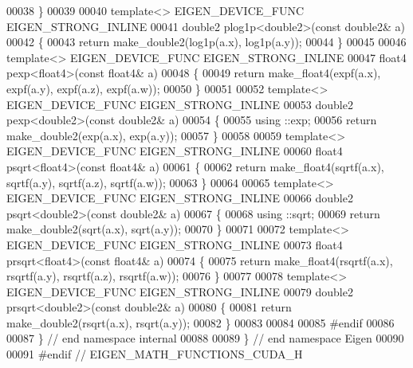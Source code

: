 \begin{DoxyCode}
00038 \}
00039 
00040 \textcolor{keyword}{template}<>  EIGEN\_DEVICE\_FUNC EIGEN\_STRONG\_INLINE
00041 double2 plog1p<double2>(\textcolor{keyword}{const} double2& a)
00042 \{
00043   \textcolor{keywordflow}{return} make\_double2(log1p(a.x), log1p(a.y));
00044 \}
00045 
00046 \textcolor{keyword}{template}<> EIGEN\_DEVICE\_FUNC EIGEN\_STRONG\_INLINE
00047 float4 pexp<float4>(\textcolor{keyword}{const} float4& a)
00048 \{
00049   \textcolor{keywordflow}{return} make\_float4(expf(a.x), expf(a.y), expf(a.z), expf(a.w));
00050 \}
00051 
00052 \textcolor{keyword}{template}<> EIGEN\_DEVICE\_FUNC EIGEN\_STRONG\_INLINE
00053 double2 pexp<double2>(\textcolor{keyword}{const} double2& a)
00054 \{
00055   using ::exp;
00056   \textcolor{keywordflow}{return} make\_double2(exp(a.x), exp(a.y));
00057 \}
00058 
00059 \textcolor{keyword}{template}<> EIGEN\_DEVICE\_FUNC EIGEN\_STRONG\_INLINE
00060 float4 psqrt<float4>(\textcolor{keyword}{const} float4& a)
00061 \{
00062   \textcolor{keywordflow}{return} make\_float4(sqrtf(a.x), sqrtf(a.y), sqrtf(a.z), sqrtf(a.w));
00063 \}
00064 
00065 \textcolor{keyword}{template}<> EIGEN\_DEVICE\_FUNC EIGEN\_STRONG\_INLINE
00066 double2 psqrt<double2>(\textcolor{keyword}{const} double2& a)
00067 \{
00068   using ::sqrt;
00069   \textcolor{keywordflow}{return} make\_double2(sqrt(a.x), sqrt(a.y));
00070 \}
00071 
00072 \textcolor{keyword}{template}<> EIGEN\_DEVICE\_FUNC EIGEN\_STRONG\_INLINE
00073 float4 prsqrt<float4>(\textcolor{keyword}{const} float4& a)
00074 \{
00075   \textcolor{keywordflow}{return} make\_float4(rsqrtf(a.x), rsqrtf(a.y), rsqrtf(a.z), rsqrtf(a.w));
00076 \}
00077 
00078 \textcolor{keyword}{template}<> EIGEN\_DEVICE\_FUNC EIGEN\_STRONG\_INLINE
00079 double2 prsqrt<double2>(\textcolor{keyword}{const} double2& a)
00080 \{
00081   \textcolor{keywordflow}{return} make\_double2(rsqrt(a.x), rsqrt(a.y));
00082 \}
00083 
00084 
00085 \textcolor{preprocessor}{#endif}
00086 
00087 \} \textcolor{comment}{// end namespace internal}
00088 
00089 \} \textcolor{comment}{// end namespace Eigen}
00090 
00091 \textcolor{preprocessor}{#endif // EIGEN\_MATH\_FUNCTIONS\_CUDA\_H}
\end{DoxyCode}
